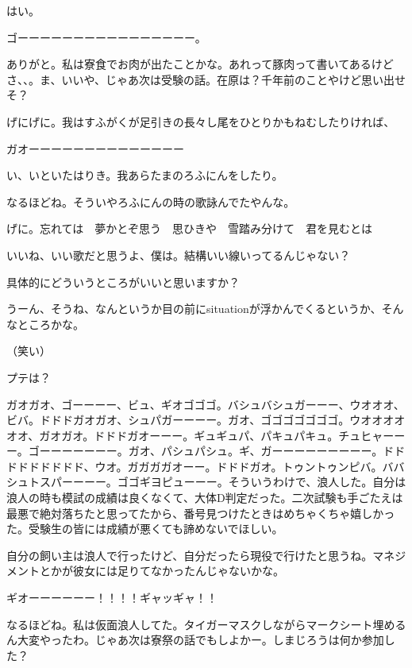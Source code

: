 \begin{multicols}{2}
はい。

ゴーーーーーーーーーーーーーーーー。

ありがと。私は寮食でお肉が出たことかな。あれって豚肉って書いてあるけどさ、、。ま、いいや、じゃあ次は受験の話。在原は？千年前のことやけど思い出せそ？

げにげに。我はすふがくが足引きの長々し尾をひとりかもねむしたりければ、

ガオーーーーーーーーーーーーーー

い、いといたはりき。我あらたまのろふにんをしたり。

なるほどね。そういやろふにんの時の歌詠んでたやんな。

げに。\newline 忘れては　夢かとぞ思う　思ひきや　雪踏み分けて　君を見むとは

いいね、いい歌だと思うよ、僕は。結構いい線いってるんじゃない？

具体的にどういうところがいいと思いますか？

うーん、そうね、なんというか目の前にsituationが浮かんでくるというか、そんなところかな。

（笑い）

プテは？

ガオガオ、ゴーーーー、ビュ、ギオゴゴゴ。バシュバシュガーーー、ウオオオ、ビバ。ドドドガオガオ、シュパガーーーー。ガオ、ゴゴゴゴゴゴゴ。ウオオオオオオ、ガオガオ。ドドドガオーーー。ギュギュパ、パキュパキュ。チュヒャーーー。ゴーーーーーーー。ガオ、パシュパシュ。ギ、ガーーーーーーーーー。ドドドドドドドドド、ウオ。ガガガガオーー。ドドドガオ。トゥントゥンピバ。ババシュトスパーーーー。ゴゴギヨピューーー。そういうわけで、浪人した。自分は浪人の時も模試の成績は良くなくて、大体D判定だった。二次試験も手ごたえは最悪で絶対落ちたと思ってたから、番号見つけたときはめちゃくちゃ嬉しかった。受験生の皆には成績が悪くても諦めないでほしい。

自分の飼い主は浪人で行ったけど、自分だったら現役で行けたと思うね。マネジメントとかが彼女には足りてなかったんじゃないかな。

ギオーーーーーー！！！！ギャッギャ！！

なるほどね。私は仮面浪人してた。タイガーマスクしながらマークシート埋めるん大変やったわ。じゃあ次は寮祭の話でもしよかー。しまじろうは何か参加した？


\end{multicols}
